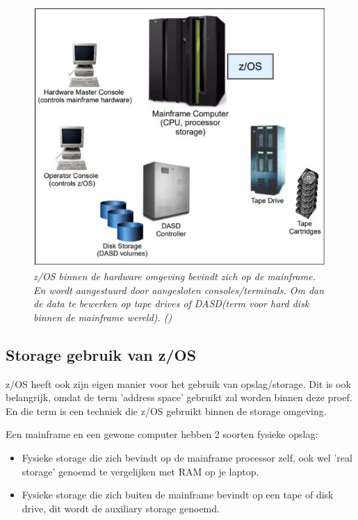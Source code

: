 \begin{figure}[h]
	\centering
	\includegraphics{img/Omgeving_zOS}
	\caption[z/OS binnen de mainframe omgeving]{{\small \textit{z/OS binnen de hardware omgeving bevindt zich op de mainframe. En wordt aangestuurd door aangesloten consoles/terminals. Om dan de data te bewerken op tape drives of DASD(term voor hard disk binnen de mainframe wereld). (\cite{Ebbers2011})}}}
	\label{fig:omgevingzos}
\end{figure}

\subsection{Storage gebruik van z/OS}
\label{subsec:Storage gebruik van z/OS}

z/OS heeft ook zijn eigen manier voor het gebruik van opslag/storage. Dit is ook belangrijk, omdat de term 'address space' gebruikt zal worden binnen deze proef. En die term is een techniek die z/OS gebruikt binnen de storage omgeving.

Een mainframe en een gewone computer hebben 2 soorten fysieke opslag:

\begin{itemize}
	\item Fysieke storage die zich bevindt op de mainframe processor zelf, ook wel 'real storage' genoemd te vergelijken met RAM op je laptop.
	\item Fysieke storage die zich buiten de mainframe bevindt op een tape of disk drive, dit wordt de auxiliary storage genoemd.
\end{itemize}

